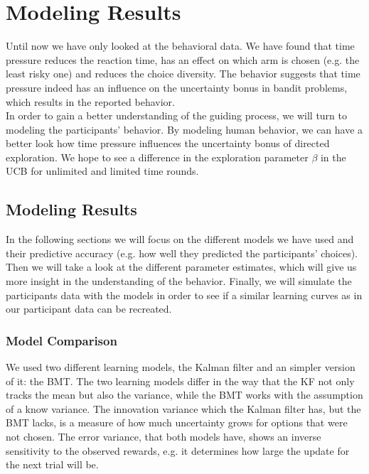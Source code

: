 \chapter{Modeling Results}\label{ch:results}
Until now we have only looked at the behavioral data. We have found that time pressure reduces the reaction time, has an effect on which arm is chosen (e.g. the least risky one) and reduces the choice diversity. The behavior suggests that time pressure indeed has an influence on the uncertainty bonus in bandit problems, which results in the reported behavior. \\
In order to gain a better understanding of the guiding process, we will turn to modeling the participants' behavior. By modeling human behavior, we can have a better look how time pressure influences the uncertainty bonus of directed exploration. We hope to see a difference in the exploration parameter $\beta$ in the UCB for unlimited and limited time rounds. 

\section{Modeling Results}
In the following sections we will focus on the different models we have used and their predictive accuracy (e.g. how well they predicted the participants' choices). Then we will take a look at the different parameter estimates, which will give us more insight in the understanding of the behavior. Finally, we will simulate the participants data with the models in order to see if a similar learning curves as in our participant data can be recreated. 

\subsection{Model Comparison}
We used two different learning models, the Kalman filter and an simpler version of it: the BMT. The two learning models differ in the way that the KF not only tracks the mean but also the variance, while the BMT works with the assumption of a know variance. The innovation variance which the Kalman filter has, but the BMT lacks, is a measure of how much uncertainty grows for options that were not chosen. The error variance, that both models have, shows an inverse sensitivity to the observed rewards, e.g. it determines how large the update for the next trial will be. 

